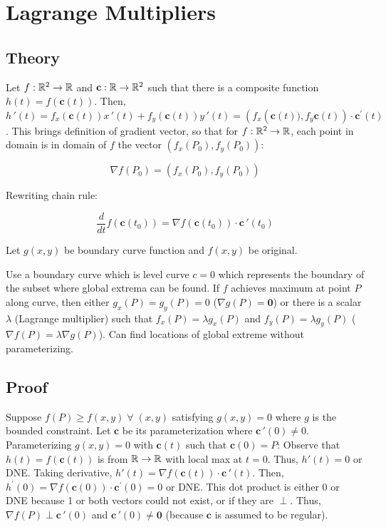 \section{Lagrange Multipliers}

\subsection{Theory}

Let $f:\mathbb{R}^2\rightarrow \mathbb{R}$ and $\textbf{c}:\mathbb{R}\rightarrow \mathbb{R}^2$ such that there is a composite function $h(t)=f(\textbf{c}(t))$.
Then, $h\,'(t)=f_x(\textbf{c}(t))x\,'(t)+f_y(\textbf{c}(t))y\,'(t)=\left(f_{x}\left(\textbf{c}(t)), f_{y} \textbf{c}(t)\right) \cdot \textbf{c}^{\prime}(t)\right.$.
This brings definition of gradient vector, so that for $f:\mathbb{R}^2\rightarrow \mathbb{R}$, each point in domain is in domain of $f$ the vector $\left(f_{x}\left(P_{0}\right), f_{y}\left(P_{0}\right)\right)$:

\[\nabla f\left(P_{0}\right)=\left(f_{x}\left(P_{0}\right), f_{y}\left(P_{0}\right)\right)\]

Rewriting chain rule:

\[\frac{d}{dt}f(\textbf{c}(t_0))=\nabla f(\textbf{c}(t_0))\cdot \textbf{c}\,'(t_0)\]

Let $g(x,y)$ be boundary curve function and $f(x,y)$ be original.

Use a boundary curve which is level curve $c=0$ which represents the boundary of the subset where global extrema can be found. 
If $f$ achieves maximum at point $P$ along curve, then either $g_x(P)=g_y(P)=0$ ($\nabla g(P)=\textbf{0}$) or there is a scalar $\lambda$ (Lagrange multiplier)
such that $f_x(P)=\lambda g_x(P)$ and $f_y(P)=\lambda g_y(P)$ ($\nabla f(P)=\lambda \nabla g(P)$). Can find locations of global extreme without parameterizing.

\subsection{Proof}

Suppose $f(P)\geq f(x,y)\;\forall\;(x,y)$ satisfying $g(x,y)=0$ where $g$ is the bounded constraint. Let $\textbf{c}$ be its parameterization where $\textbf{c}\,'(0)\neq 0$. Parameterizing $g(x,y)=0$ with $\textbf{c}(t)$
such that $\textbf{c}(0)=P$: Observe that $h(t)=f(\textbf{c}(t))$ is from $\mathbb{R}\rightarrow\mathbb{R}$ with local max at $t=0$.
Thus, $h'(t)=0$ or DNE. Taking derivative, $h'(t)=\nabla f(\textbf{c}(t))\cdot \textbf{c}\,'(t)$.
Then, $h^{\prime}(0)=\nabla f(\textbf{c}(0)) \cdot \textbf{c}^{\prime}(0)=0$ or DNE. This dot product is either 0 or DNE because
1 or both vectors could not exist, or if they are $\perp$. Thus, $\nabla f(P)\perp \textbf{c}\,'(0)$ and $\textbf{c}\,'(0)\neq \textbf{0}$ (because $\textbf{c}$ is assumed to be regular).


